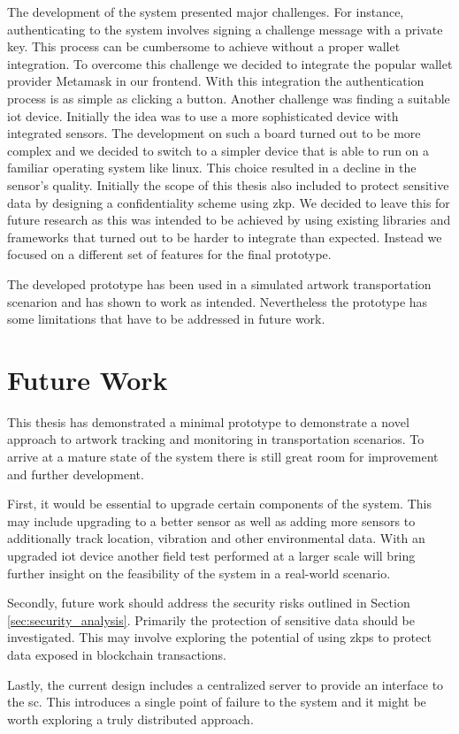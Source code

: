 The development of the system presented major challenges. For instance, authenticating to the system involves signing a challenge message with a private key. This process can be cumbersome to achieve without a proper wallet integration. To overcome this challenge we decided to integrate the popular wallet provider Metamask in our frontend. With this integration the authentication process is as simple as clicking a button. Another challenge was finding a suitable \gls{iot} device. Initially the idea was to use a more sophisticated device with integrated sensors. The development on such a board turned out to be more complex and we decided to switch to a simpler device that is able to run on a familiar operating system like linux. This choice resulted in a decline in the sensor's quality. Initially the scope of this thesis also included to protect sensitive data by designing a confidentiality scheme using \gls{zkp}. We decided to leave this for future research as this was intended to be achieved by using existing libraries and frameworks that turned out to be harder to integrate than expected. Instead we focused on a different set of features for the final prototype.

The developed prototype has been used in a simulated artwork transportation scenarion and has shown to work as intended. Nevertheless the prototype has some limitations that have to be addressed in future work.

\section{Future Work}
This thesis has demonstrated a minimal prototype to demonstrate a novel approach to artwork tracking and monitoring in transportation scenarios. To arrive at a mature state of the system there is still great room for improvement and further development.

First, it would be essential to upgrade certain components of the system. This may include upgrading to a better sensor as well as adding more sensors to additionally track location, vibration and other environmental data. With an upgraded \gls{iot} device another field test performed at a larger scale will bring further insight on the feasibility of the system in a real-world scenario.

Secondly, future work should address the security risks outlined in Section \ref{sec:security_analysis}. Primarily the protection of sensitive data should be investigated. This may involve exploring the potential of using \glspl{zkp} to protect data exposed in blockchain transactions.

Lastly, the current design includes a centralized server to provide an interface to the \gls{sc}. This introduces a single point of failure to the system and it might be worth exploring a truly distributed approach. 